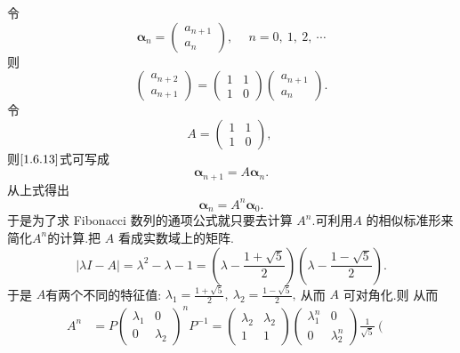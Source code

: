\begin{solution}
	令
	$$\boldsymbol{\alpha}_{n}=\left(\begin{array}{l}
		a_{n+1} \\
		a_{n}
	\end{array}\right),\  \quad n=0,\ 1,\ 2,\  \cdots$$
	则
	\begin{equation}
		\left(\begin{array}{l}
			a_{n+2} \\
			a_{n+1}
		\end{array}\right)=\left(\begin{array}{ll}
			1 & 1 \\
			1 & 0
		\end{array}\right)\left(\begin{array}{c}
			a_{n+1} \\
			a_{n}
		\end{array}\right) .\label{1.6.13}
	\end{equation}
	令
	$$A=\left(\begin{array}{ll}
		1 & 1 \\
		1 & 0
	\end{array}\right),\ $$
	则$\eqref{1.6.13}$式可写成
	$$\boldsymbol{\alpha}_{n+1}=A \boldsymbol{\alpha}_{n}.$$
	从上式得出 
	\begin{equation}
		\boldsymbol{\alpha}_{n}=A^{n} \boldsymbol{\alpha}_{0} .\label{1.6.14}
	\end{equation}
	于是为了求 Fibonacci 数列的通项公式就只要去计算 $ A^{n} .$可利用$  A $ 的相似标准形来简化$  A^{n}  $的计算.把 $ A $ 看成实数域上的矩阵.
	$$|\lambda I-A|=\lambda^{2}-\lambda-1=\left(\lambda-\frac{1+\sqrt{5}}{2}\right)\left(\lambda-\frac{1-\sqrt{5}}{2}\right) .$$
	于是  $A  $有两个不同的特征值: $ \lambda_{1}=\frac{1+\sqrt{5}}{2},\  \lambda_{2}=\frac{1-\sqrt{5}}{2} ,\  $从而 $ A $ 可对角化.则 从而
	$$\begin{aligned}
		A^{n} & =P\left(\begin{array}{cc}
			\lambda_{1} & 0 \\
			0 & \lambda_{2}
		\end{array}\right)^{n} P^{-1}=\left(\begin{array}{cc}
			\lambda_{2} & \lambda_{2} \\
			1 & 1
		\end{array}\right)\left(\begin{array}{cc}
			\lambda_{1}^{n} & 0 \\
			0 & \lambda_{2}^{n}
		\end{array}\right) \frac{1}{\sqrt{5}}\left(\begin{array}{rr}

\end{array}
\end{aligned}$$
\end{solution}
